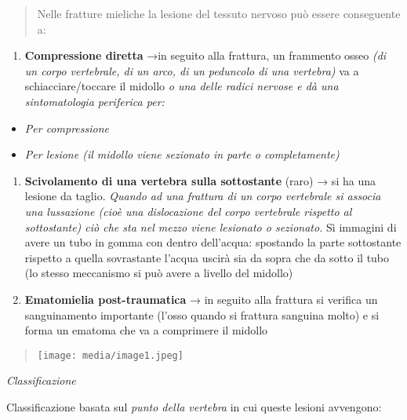 \documentclass[]{article}
\begin{document}
\begin{quote}
Nelle fratture mieliche la lesione del tessuto nervoso può essere
conseguente a:
\end{quote}

\begin{enumerate}
\def\labelenumi{\arabic{enumi}.}
\item
  \textbf{Compressione diretta} →in seguito alla frattura, un frammento
  osseo \emph{(di un corpo vertebrale, di un arco, di un peduncolo di
  una vertebra)} va a schiacciare/toccare il midollo \emph{o una delle
  radici nervose e dà una sintomatologia periferica per:}
\end{enumerate}

\begin{itemize}
\item
  \emph{Per compressione}
\item
  \emph{Per lesione (il midollo viene sezionato in parte o
  completamente)}
\end{itemize}

\begin{enumerate}
\def\labelenumi{\arabic{enumi}.}
\item
  \textbf{Scivolamento di una vertebra sulla sottostante} (raro) → si ha
  una lesione da taglio. \emph{Quando ad una frattura di un corpo
  vertebrale si associa una lussazione (cioè una dislocazione del corpo
  vertebrale rispetto al sottostante) ciò che sta nel mezzo viene
  lesionato o sezionato.} Sì immagini di avere un tubo in gomma con
  dentro dell'acqua: spostando la parte sottostante rispetto a quella
  sovrastante l'acqua uscirà sia da sopra che da sotto il tubo (lo
  stesso meccanismo si può avere a livello del midollo)
\item
  \textbf{Ematomielia post-traumatica} → in seguito alla frattura si
  verifica un sanguinamento importante (l'osso quando si frattura
  sanguina molto) e si forma un ematoma che va a comprimere il midollo
\end{enumerate}

\begin{quote}
\texttt{[image: media/image1.jpeg]}
\end{quote}

\emph{Classificazione}

Classificazione basata sul \emph{punto della vertebra} in cui queste
lesioni avvengono:
\end{document}
